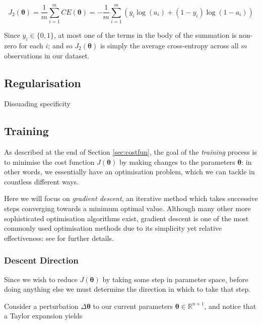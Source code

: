 \documentclass{article}[11pt]
\begin{document}
        $$
        J_2(\boldsymbol{\theta}) = \frac{1}{m} \sum_{i=1}^{m} CE(\boldsymbol{\theta}) = - \frac{1}{m} \sum_{i=1}^{m} \left( y_i \log(a_i) + (1 - y_i) \log(1 - a_i) \right)
        $$
        
        Since $y_i \in \{0, 1\}$, at most one of the terms in the body of the summation is non-zero for each $i$; and so $J_2(\boldsymbol{\theta})$ is simply the average cross-entropy across all $m$ observations in our dataset.
    
    
    
    \subsection{Regularisation}
        
        
        Dissuading specificity
        
        
    \subsection{Training}
        
        As described at the end of Section \ref{sec:costfun}, the goal of the \textit{training} process is to minimise the cost function $J(\boldsymbol{\theta})$ by making changes to the parameters $\boldsymbol{\theta}$: in other words, we essentially have an optimisation problem, which we can tackle in countless different ways.
        
        Here we will focus on \textit{gradient descent}, an iterative method which takes successive steps converging towards a minimum optimal value. Although many other more sophisticated optimisation algorithms exist, gradient descent is one of the most commonly used optimisation methods due to its simplicity yet relative effectiveness: see \cite{lecun_backprop} for further details.
        
        
        \subsubsection{Descent Direction}
            
            Since we wish to reduce $J(\boldsymbol{\theta})$ by taking some step in parameter space, before doing anything else we must determine the direction in which to take that step.
            
            Consider a perturbation $\Delta \boldsymbol{\theta}$ to our current parameters $\boldsymbol{\theta} \in \mathbb{R}^{n+1}$, and notice that a Taylor expansion yields
            
\end{document}
